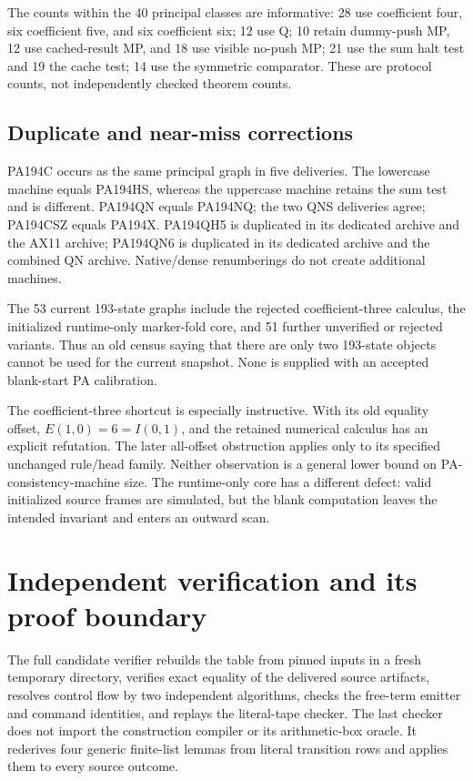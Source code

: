 \documentclass[11pt,letterpaper]{article}
\theoremstyle{definition}\newtheorem{definition}[theorem]{Definition}
\theoremstyle{remark}\newtheorem{remark}[theorem]{Remark}
\newcommand{\file}[1]{\path{#1}}
\begin{document}
The counts within the 40 principal classes are informative: 28 use
coefficient four, six coefficient five, and six coefficient six; 12 use Q;
10 retain dummy-push MP, 12 use cached-result MP, and 18 use visible no-push
MP; 21 use the sum halt test and 19 the cache test; 14 use the symmetric
comparator. These are protocol counts, not independently checked theorem
counts.

\subsection{Duplicate and near-miss corrections}

PA194C occurs as the same principal graph in five deliveries. The lowercase
\file{pa194ns_conpa} machine equals PA194HS, whereas the uppercase
\file{PA194NS_research} machine retains the sum test and is different.
PA194QN equals PA194NQ; the two QNS deliveries agree; PA194CSZ equals
PA194X. PA194QH5 is duplicated in its dedicated archive and the AX11 archive;
PA194QN6 is duplicated in its dedicated archive and the combined QN archive.
Native/dense renumberings do not create additional machines.

The 53 current 193-state graphs include the rejected coefficient-three
calculus, the initialized runtime-only marker-fold core, and 51 further
unverified or rejected variants. Thus an old census saying that there are
only two 193-state objects cannot be used for the current snapshot. None
is supplied with an accepted blank-start PA calibration.

The coefficient-three shortcut is especially instructive. With its old
equality offset, $E(1,0)=6=I(0,1)$, and the retained numerical calculus has
an explicit refutation. The later all-offset obstruction applies only to
its specified unchanged rule/head family. Neither observation is a general
lower bound on PA-consistency-machine size. The runtime-only core has a
different defect: valid initialized source frames are simulated, but the
blank computation leaves the intended invariant and enters an outward scan.



\section{Independent verification and its proof boundary}
\label{sec:verification}

The full candidate verifier rebuilds the table from pinned inputs in a
fresh temporary directory, verifies exact equality of the delivered source
artifacts, resolves control flow by two independent algorithms, checks the
free-term emitter and command identities, and replays the literal-tape
checker. The last checker does not import the construction compiler or its
arithmetic-box oracle. It rederives four generic finite-list lemmas from
literal transition rows and applies them to every source outcome.
\end{document}
